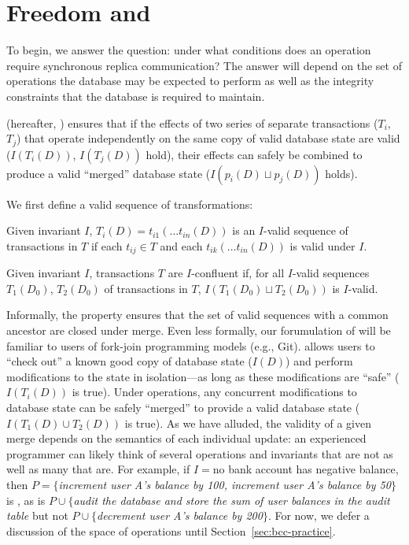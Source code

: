 
\section{Freedom and \iconfluence}
\label{sec:bcc-theory}

To begin, we answer the question: under what conditions does an
operation require synchronous replica communication? The answer will
depend on the set of operations the database may be expected to
perform as well as the integrity constraints that the database is
required to maintain.

\fullnameconfluence (hereafter, \iconfluence) ensures that if the
effects of two series of separate transactions ($T_i$, $T_j$) that
operate independently on the same copy of valid database state are
valid ($I(T_i(D))$, $I(T_j(D))$ hold), their effects can safely be
combined to produce a valid ``merged'' database state ($I(p_i(D)
\sqcup p_j(D))$ holds).

We first define a valid sequence of transformations:

\begin{definition}
Given invariant $I$, $T_i(D) = t_{i1}(\dots t_{in}(D))$ is an
$I$-valid sequence of transactions in $T$ if each $t_{ij} \in T$ and
each $t_{ik}(\dots t_{in}(D))$ is valid under $I$.
\end{definition}

\begin{definition}[\iconfluence]
Given invariant $I$, transactions $T$ are $I$-confluent if, for all
$I$-valid sequences $T_1(D_0)$, $T_2(D_0)$ of transactions in $T$,
$I(T_1(D_0) \sqcup T_2(D_0))$ is $I$-valid.
\end{definition}

Informally, the \iconfluence property ensures that the set of valid
sequences with a common ancestor are closed under merge. Even less
formally, our forumulation of \iconfluence will be familiar to users
of fork-join programming models (e.g., Git). \iconfluence allows users
to ``check out'' a known good copy of database state ($I(D)$) and
perform modifications to the state in isolation---as long as these
modifications are ``safe'' ($I(T_i(D))$ is true). Under \iconfluent
operations, any concurrent modifications to database state can be
safely ``merged'' to provide a valid database state ($I(T_1(D) \cup
T_2(D))$ is true). As we have alluded, the validity of a given merge
depends on the semantics of each individual update: an experienced
programmer can likely think of several operations and invariants that
are not \iconfluent as well as many that are. For example, if $I=$no
bank account has negative balance, then $P=\{$\textit{increment user
  A's balance by 100, increment user A's balance by 50}$\}$ is
\iconfluent, as is $P\cup\{$\textit{audit the database and store the
  sum of user balances in the \textrm{audit} table} but not
$P\cup\{$\textit{decrement user A's balance by 200}$\}$. For now, we
defer a discussion of the space of operations until
Section~\ref{sec:bcc-practice}. 

